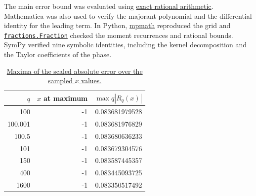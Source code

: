 \documentclass[11pt,a4paper]{article}
\DeclareRobustCommand{\suppfile}[2]{\href{https://github.com/tiagocampinasilva/alternating-hurwitz-zeta/blob/v1.0.0/#1}{#2}}
\begin{document}
The main error bound was evaluated using \suppfile{Verification/exact_coefficients.csv}{exact rational arithmetic}.
Mathematica was also used to verify the majorant polynomial and the
differential identity for the leading term. In Python, \suppfile{Python/numerical_checks.py}{mpmath} reproduced the grid and
\suppfile{Python/exact_arithmetic.py}{\texttt{fractions.Fraction}} checked the moment recurrences and rational
bounds. \suppfile{Python/identity_checks.py}{SymPy} \cite{SymPy2017} verified nine symbolic identities,
including the kernel decomposition and the Taylor coefficients of the phase.

\begin{table}[htbp]
\centering
\caption{\suppfile{Verification/table_1.csv}{Maxima of the scaled absolute error over the sampled $x$ values.}}
\label{tab:max}
\begin{tabular}{rrr}\hline
$q$ & $x$ at maximum & $\max q|R_q(x)|$ \\\hline
100 & -1 & 0.083681979528 \\
100.001 & -1 & 0.083681976829 \\
100.5 & -1 & 0.083680636233 \\
101 & -1 & 0.083679304576 \\
150 & -1 & 0.083587445357 \\
400 & -1 & 0.083445093725 \\
1600 & -1 & 0.083350517492 \\
\hline\end{tabular}
\end{table}
\end{document}
